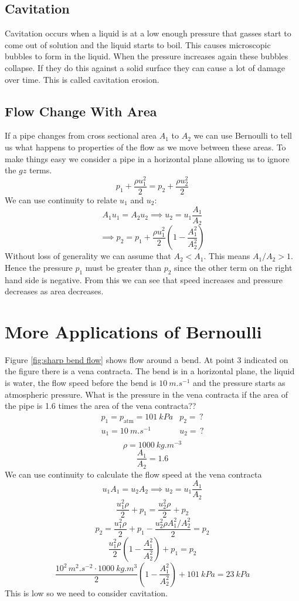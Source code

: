 \documentclass{article}
\begin{document}
    \subsection{Cavitation}
    Cavitation occurs when a liquid is at a low enough pressure that gasses start to come out of solution and the liquid starts to boil. 
    This causes microscopic bubbles to form in the liquid.
    When the pressure increases again these bubbles collapse.
    If they do this against a solid surface they can cause a lot of damage over time.
    This is called cavitation erosion.
    
    \subsection{Flow Change With Area}
    If a pipe changes from cross sectional area \(A_1\) to \(A_2\) we can use Bernoulli to tell us what happens to properties of the flow as we move between these areas.
    To make things easy we consider a pipe in a horizontal plane allowing us to ignore the \(gz\) terms.
    \[p_1 + \frac{\rho u_1^2}{2} = p_2 + \frac{\rho u_2^2}{2}\]
    We can use continuity to relate \(u_1\) and \(u_2\):
    \[A_1u_1 = A_2u_2\implies u_2 = u_1\frac{A_1}{A_2}\]
    \[\implies p_2 = p_1 + \frac{\rho u_1^2}{2}\left(1 - \frac{A_1^2}{A_2^2}\right)\]
    Without loss of generality we can assume that \(A_2 < A_1\).
    This means \(A_1/A_2 > 1\).
    Hence the pressure \(p_1\) must be greater than \(p_2\) since the other term on the right hand side is negative.
    From this we can see that speed increases and pressure decreases as area decreases.
    
    \section{More Applications of Bernoulli}
    \example
    Figure \ref{fig:sharp bend flow} shows flow around a bend. 
    At point 3 indicated on the figure there is a vena contracta. 
    The bend is in a horizontal plane, the liquid is water, the flow speed before the bend is \(\SI{10}{m.s^{-1}}\) and the pressure starts as atmospheric pressure. 
    What is the pressure in the vena contracta if the area of the pipe is 1.6 times the area of the vena contracta??
    \[
        \begin{array}{cc}
            p_1 = p_\text{atm} = \SI{101}{kPa} & p_2 = \,?\\
            u_1 = \SI{10}{m.s^{-1}} & u_2 = \,?\\
        \end{array}
    \]
    \[\rho = \SI{1000}{kg.m^{-3}}\]
    \[\frac{A_1}{A_2} = 1.6\]
    We can use continuity to calculate the flow speed at the vena contracta
    \[u_1A_1 = u_2A_2 \implies u_2 = u_1\frac{A_1}{A_2}\]
    \[\frac{u_1^2\rho}{2} + p_1 = \frac{u_2^2\rho}{2} + p_2\]
    \[p_2 = \frac{u_1^2\rho}{2} + p_1 - \frac{u_2^2\rho A_1^2/A_2^2}{2} = p_2\]
    \[\frac{u_1^2\rho}{2}\left(1 - \frac{A_1^2}{A_2^2}\right) + p_1 = p_2\]
    \[\frac{10^2\,\si{m^2.s^{-2}}\cdot \SI{1000}{kg.m^3}}{2}\left(1 - \frac{A_1^2}{A_2^2}\right) + \SI{101}{kPa} = \SI{23}{kPa}\]
    This is low so we need to consider cavitation.
    
\end{document}
